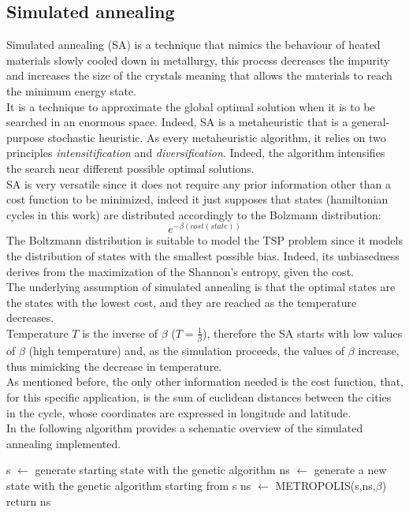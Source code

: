 \documentclass{article}
\begin{document}
\subsection{Simulated annealing}
Simulated annealing (SA) is a technique that mimics the behaviour of heated materials slowly cooled down in metallurgy, this process decreases the impurity and increases the size of the crystals meaning that allows the materials to reach the minimum energy state. \\
It is a technique to approximate the global optimal solution when it is to be searched in an enormous space. Indeed, SA is a metaheuristic that is a general-purpose stochastic heuristic. As every metaheuristic algorithm, it relies on two principles \textit{intensitification} and \textit{diversification}. Indeed, the algorithm intensifies the search near different possible optimal solutions.\\
SA is very versatile since it does not require any prior information other than a cost function to be minimized, indeed it just supposes that states (hamiltonian cycles in this work) are distributed accordingly to the Bolzmann distribution:
\begin{equation}
e^{- \beta (cost(state))}
\end{equation}
The Boltzmann distribution is suitable to model the TSP problem since it models the distribution of states with the smallest possible bias. Indeed, its unbiasedness derives from the maximization of the Shannon's entropy, given the cost.\\
The underlying assumption of simulated annealing is that the optimal states are the states with the lowest cost, and they are reached as the temperature decreases.\\
Temperature $T$ is the inverse of $\beta$ ($T = \frac{1}{\beta}$), therefore the SA starts with low values of $\beta$ (high temperature) and, as the simulation proceeds, the values of $\beta$  increase, thus mimicking the decrease in temperature. \\
As mentioned before, the only other information needed is the cost function, that, for this specific application, is the sum of euclidean distances between the cities in the cycle, whose coordinates are expressed in longitude and latitude.\\
In the following algorithm provides a schematic overview of the simulated annealing implemented.

\begin{algorithm}[H]
    \begin{algorithmic}[1]
        \State s $\leftarrow$ generate starting state with the genetic algorithm
         	 \State ns $\leftarrow$ generate a new state with the genetic algorithm starting from s
         	\State ns $\leftarrow$ METROPOLIS(s,ns,$\beta$)
         	\EndFor
        \EndFor
        \State return ns
       \EndFunction
\end{algorithmic}
\end{algorithm}
\end{document}
